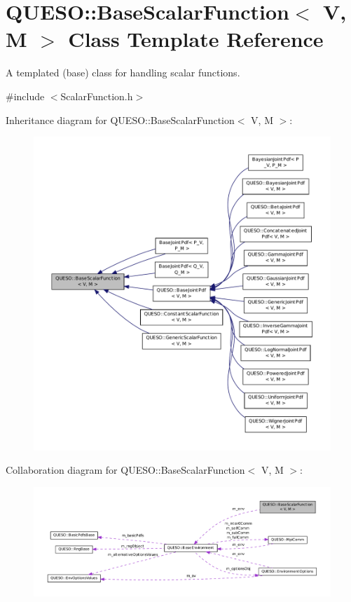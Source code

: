 \hypertarget{class_q_u_e_s_o_1_1_base_scalar_function}{\section{Q\-U\-E\-S\-O\-:\-:Base\-Scalar\-Function$<$ V, M $>$ Class Template Reference}
\label{class_q_u_e_s_o_1_1_base_scalar_function}
}


A templated (base) class for handling scalar functions.  




{\ttfamily \#include $<$Scalar\-Function.\-h$>$}



Inheritance diagram for Q\-U\-E\-S\-O\-:\-:Base\-Scalar\-Function$<$ V, M $>$\-:
\nopagebreak
\begin{figure}[H]
\begin{center}
\leavevmode
\includegraphics[width=350pt]{class_q_u_e_s_o_1_1_base_scalar_function__inherit__graph}
\end{center}
\end{figure}


Collaboration diagram for Q\-U\-E\-S\-O\-:\-:Base\-Scalar\-Function$<$ V, M $>$\-:
\nopagebreak
\begin{figure}[H]
\begin{center}
\leavevmode
\includegraphics[width=350pt]{class_q_u_e_s_o_1_1_base_scalar_function__coll__graph}
\end{center}
\end{figure}
